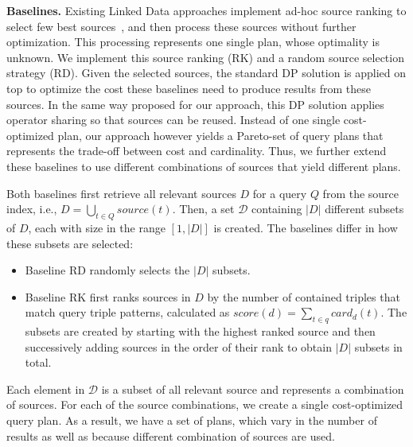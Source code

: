 \textbf{Baselines.} Existing Linked Data approaches implement ad-hoc source ranking to select few best sources~\cite{harth_data_2010,ladwig_linked_2010}, and then process these sources without further optimization. This processing represents one single plan, whose optimality is unknown. We implement this source ranking (RK) and a random source selection strategy (RD). Given the selected sources, the standard DP solution is applied on top to optimize the cost these baselines need to produce results from these sources. In the same way proposed for our approach, this DP solution applies operator sharing so that sources can be reused. Instead of one single cost-optimized plan, our approach however yields a Pareto-set of query plans that represents the trade-off between cost and cardinality. Thus, we further extend these baselines to use different combinations of sources that yield different plans. 

Both baselines first retrieve all relevant sources $D$ for a query $Q$
from the source index, i.e., $D = \bigcup_{t \in Q} source(t)$. Then, a set $\mathcal{D}$ containing $|D|$ different subsets of $D$, each with size in the range $[1,|D|]$ is created. 
The baselines differ in how these
subsets are selected:
\begin{itemize}
\item Baseline RD randomly selects the $|D|$ subsets.
\item Baseline RK first ranks sources in $D$ by the number of
  contained triples that match query triple patterns, calculated as
  $score(d) = \sum_{t \in q} card_d(t)$. The subsets are created
  by starting with the highest ranked source and then successively
  adding sources in the order of their rank to obtain $|D|$ subsets in
  total.
\end{itemize}
Each element in $\mathcal{D}$ is a subset of all relevant source and
represents a combination of sources. For each of the source
combinations, we create a single cost-optimized query plan. As a result, we have a set of plans, which vary in the number of results as well as because different combination of sources are used. 

